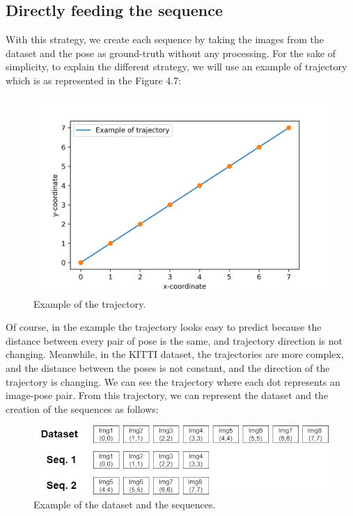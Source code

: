 \subsection{Directly feeding the sequence}\label{subsec:directly-feeding-the-sequence}
With this strategy, we create each sequence by taking the images from the dataset and the pose as ground-truth without any processing.
For the sake of simplicity, to explain the different strategy, we will use an example of trajectory which is as represented in the Figure 4.7:
\begin{figure}[H]
    \centering
    \includegraphics[width=\textwidth]{images/4_2_example_of_trajectory}
    \caption{Example of the trajectory.}
    \label{fig:example-of-trajectory}
\end{figure}
Of course, in the example the trajectory looks easy to predict because the distance between every pair of pose is the same, and trajectory direction is not changing.
Meanwhile, in the KITTI dataset, the trajectories are more complex, and the distance between the poses is not constant, and the direction of the trajectory is changing.
We can see the trajectory where each dot represents an image-pose pair.
From this trajectory, we can represent the dataset and  the creation of the sequences as follows:
\begin{figure}[H]
    \centering
    \includegraphics[width=\textwidth]{images/4_2_directly_feeding}
    \caption{Example of the dataset and the sequences.}
    \label{fig:example-of-dataset}
\end{figure}
